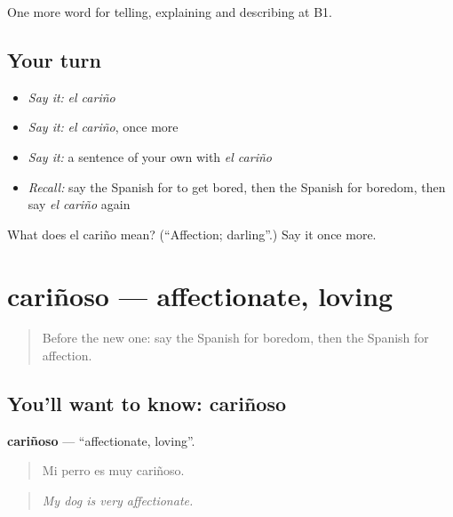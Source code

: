 \begin{grammarlens}[title={What you've built}]
One more word for telling, explaining and describing at B1.
\end{grammarlens}

\subsection*{Your turn}
\begin{itemize}
\raggedright
  \item \emph{Say it:} \emph{el cariño}
  \item \emph{Say it:} \emph{el cariño}, once more
  \item \emph{Say it:} a sentence of your own with \emph{el cariño}
  \item \emph{Recall:} say the Spanish for to get bored, then the Spanish for boredom, then say \emph{el cariño} again
\end{itemize}

\begin{tcolorbox}[breakable,colback=teal!4,colframe=teal!35!black,title={Before you move on}]
What does el cariño mean? (\textquotedblleft{}Affection; darling\textquotedblright{}.) Say it once more.
\end{tcolorbox}
\section[cariñoso]{cariñoso — affectionate, loving}

\label{lesson:ES-C714-carinoso}



\begin{quote}
Before the new one: say the Spanish for boredom, then the Spanish for affection.
\end{quote}

\subsection*{You'll want to know: cariñoso}
\textbf{cariñoso} — \textquotedblleft{}affectionate, loving\textquotedblright{}.

\begin{quote}
Mi perro es muy cariñoso.
\end{quote}

\begin{quote}
\emph{My dog is very affectionate.}
\end{quote}

